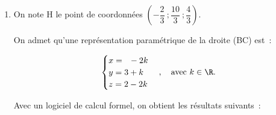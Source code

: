 \begin{enumerate}
\begin{enumerate}[label=\textbf{\alph*.}]
Le réel $t$ vérifie donc l'équation:
$5\left (8+5t\right ) + 8\left (2+8t\right ) - \left (-11-t\right )-22=0$,
c'est-à-dire:
$40+25t+16+64t+11+t-22=0$
soit:
$90t +45=0$
donc: $t=-\dfrac{1}{2}$

On a donc:
$\left \{
\begin{array}{l !{=} l}
x_{\text E} & 8+5 \times \left (- \frac{1}{2}\right )\\
y_{\text E} & 2+8\times \left (- \frac{1}{2}\right )\\
z_{\text E} & -11 - \left (- \frac{1}{2}\right )
\end{array}
\right .$
c'est-à-dire:
$\left \{
\begin{array}{l !{=} l}
x_{\text E} &  \frac{11}{2}\\
y_{\text E} & -2\\
z_{\text E} & - \frac{21}{2}
\end{array}
\right .$

		\item La valeur exacte de la longueur DE, distance du point D au plan (ABC) est: 
		
$\aligned
\text{DE}
& =\ds\sqrt{\left (x_{\text E} - x_{\text D}\right )^2 + \left (y_{\text E} - y_{\text D}\right )^2 + \left (z_{\text E} - z_{\text D}\right )^2}
 =\ds\sqrt{\left (\frac{11}{2} - 8\right )^2 + \left (-2 - 2\right )^2 + \left (-\frac{21}{2} - (-11)\right )^2}\\
 & = \ds\sqrt{\left (-\frac{5}{2}\right )^2 + \left (-4\right )^2 + \left (\frac{1}{2}\right )^2}
 = \ds\sqrt{\frac{25}{4} + 16 + \frac{1}{4} }
  = \ds\sqrt{\frac{90}{4}}
  = \dfrac{3\sqrt{10}}{2}
\endaligned$		
		
		  
	\end{enumerate}
\item On note H le point de coordonnées $\left(-\dfrac{2}{3}~;\dfrac{10}{3}~;\dfrac{4}{3}\right)$.

On admet qu'une représentation paramétrique de la droite (BC) est~:

\[
\begin{cases}
x = \phantom{3}-2k\\
y = 3+k\\
z = 2-2k
\end{cases}, \quad \text{avec } k \in \R.
\]

Avec un logiciel de calcul formel, on obtient les résultats suivants~:


\end{enumerate}
